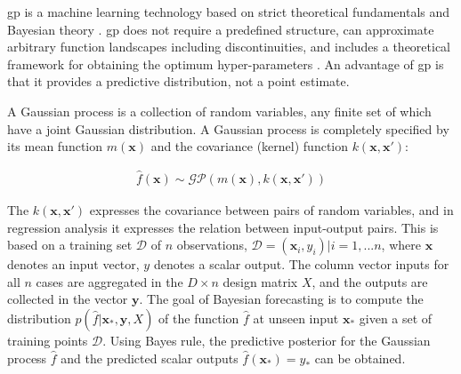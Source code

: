\documentclass[10pt,conference,a4paper]{IEEEtran}
\begin{document}

\ac{gp} is a machine learning technology based on strict theoretical fundamentals and Bayesian theory \cite{Seeger04gaussianprocesses,Rasmussen06gaussianprocesses}. \ac{gp} does not require a predefined structure, can approximate arbitrary function landscapes including discontinuities, and includes a theoretical framework for obtaining the optimum hyper-parameters \cite{5194095}. An advantage of \ac{gp} is that it provides a predictive distribution, not a point estimate.


A Gaussian process is a collection of random variables, any finite set of which have a joint Gaussian distribution. A Gaussian process is completely specified by its mean function $m(\mathbf{x})$ and the covariance (kernel) function $k(\mathbf{x},\mathbf{x'})$:



\begin{align} 
\hat{f}(\mathbf{x}) \sim \mathcal{G}\mathcal{P}(m(\mathbf{x}),k(\mathbf{x},\mathbf{x'}))
\end{align}


The $k(\mathbf{x},\mathbf{x'})$ expresses the covariance between pairs of random variables, and in regression analysis it expresses the relation between input-output pairs. This is based on a training set $\mathcal{D}$ of $n$ observations, $\mathcal{D}={(\mathbf{x}_i,y_{i}) | i = 1, ... n} $, where $\mathbf{x}$ denotes an input vector, $y$ denotes a scalar output. The column vector inputs for all $n$ cases are aggregated in the $D \times n$ design matrix $X$, and the outputs are collected in the vector $\mathbf{y}$. The goal of Bayesian forecasting is to compute the distribution $p(\hat{f}|\mathbf{x_*},\mathbf{y},X)$ of the function $\hat{f}$ at unseen input $\mathbf{x_{*}}$ given a set of training points $\mathcal{D}$. Using Bayes rule, the predictive posterior for the Gaussian process $\hat{f}$ and the predicted scalar outputs $\hat{f}(\mathbf{x_*})=y_*$ can be obtained.

\end{document}
